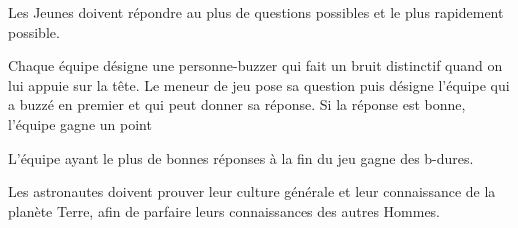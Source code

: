 \documentclass{grand-jeu}
\begin{document}
\begin{liste-materiel}
\end{liste-materiel}

\begin{regles}
Les Jeunes doivent répondre au plus de questions possibles et le plus rapidement possible. 

Chaque équipe désigne une personne-buzzer qui fait un bruit distinctif quand on lui appuie sur la tête.
Le meneur de jeu pose sa question puis désigne l'équipe qui a buzzé en premier et qui peut donner sa réponse. Si la réponse est bonne, l'équipe gagne un point

L'équipe ayant le plus de bonnes réponses à la fin du jeu gagne des b-dures. 
\end{regles}

\begin{imaginaire}
Les astronautes doivent prouver leur culture générale et leur connaissance de la planète Terre, afin de parfaire leurs connaissances des autres Hommes. 
\end{imaginaire}

\begin{moments-stop}
\end{moments-stop}
\end{document}
